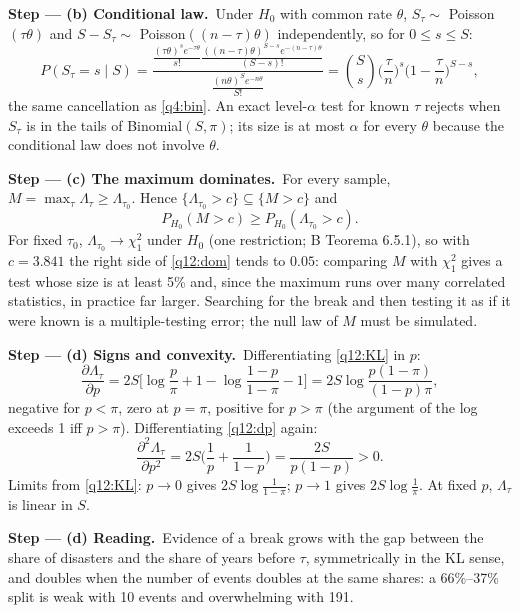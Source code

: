 \documentclass[11pt,a4paper]{article}
\numberwithin{equation}{questao}   %
\newcommand{\passo}[2]{\par\smallskip\noindent\textbf{Step --- #1.}~#2}
\newcommand{\1}{\mathbf{1}}
\begin{document}
\begin{sol}
\passo{(b) Conditional law}{Under $H_0$ with common rate $\theta$, $S_\tau\sim$ Poisson$(\tau\theta)$
and $S-S_\tau\sim$ Poisson$((n-\tau)\theta)$ independently, so for $0\le s\le S$:}
\[
P(S_\tau=s\mid S)=\frac{\frac{(\tau\theta)^se^{-\tau\theta}}{s!}\frac{((n-\tau)\theta)^{S-s}e^{-(n-\tau)\theta}}{(S-s)!}}{\frac{(n\theta)^Se^{-n\theta}}{S!}}
=\binom Ss\Big(\frac\tau n\Big)^s\Big(1-\frac\tau n\Big)^{S-s},
\]
the same cancellation as \eqref{q4:bin}. An exact level-$\alpha$ test for known $\tau$ rejects when
$S_\tau$ is in the tails of Binomial$(S,\pi)$; its size is at most $\alpha$ for every $\theta$
because the conditional law does not involve $\theta$.

\passo{(c) The maximum dominates}{For every sample, $M=\max_\tau\Lambda_\tau\ge\Lambda_{\tau_0}$.
Hence $\{\Lambda_{\tau_0}>c\}\subseteq\{M>c\}$ and}
\begin{equation}\label{q12:dom}
P_{H_0}(M>c)\ge P_{H_0}(\Lambda_{\tau_0}>c).
\end{equation}
For fixed $\tau_0$, $\Lambda_{\tau_0}\to\chi^2_1$ under $H_0$ (one restriction; B Teorema 6.5.1), so
with $c=3.841$ the right side of \eqref{q12:dom} tends to $0.05$: comparing $M$ with $\chi^2_1$
gives a test whose size is at least 5\% and, since the maximum runs over many correlated
statistics, in practice far larger. Searching for the break and then testing it as if it were
known is a multiple-testing error; the null law of $M$ must be simulated.

\passo{(d) Signs and convexity}{Differentiating \eqref{q12:KL} in $p$:}
\begin{equation}\label{q12:dp}
\frac{\partial\Lambda_\tau}{\partial p}=2S\Big[\log\frac p\pi+1-\log\frac{1-p}{1-\pi}-1\Big]
=2S\log\frac{p(1-\pi)}{(1-p)\pi},
\end{equation}
negative for $p<\pi$, zero at $p=\pi$, positive for $p>\pi$ (the argument of the log exceeds 1
iff $p>\pi$). Differentiating \eqref{q12:dp} again:
\[
\frac{\partial^2\Lambda_\tau}{\partial p^2}=2S\Big(\frac1p+\frac1{1-p}\Big)=\frac{2S}{p(1-p)}>0 .
\]
Limits from \eqref{q12:KL}: $p\to0$ gives $2S\log\frac1{1-\pi}$; $p\to1$ gives $2S\log\frac1\pi$.
At fixed $p$, $\Lambda_\tau$ is linear in $S$.

\passo{(d) Reading}{Evidence of a break grows with the gap between the share of disasters and
the share of years before $\tau$, symmetrically in the KL sense, and doubles when the number of
events doubles at the same shares: a 66\%--37\% split is weak with 10 events and overwhelming with
191.}


\end{sol}
\end{document}

